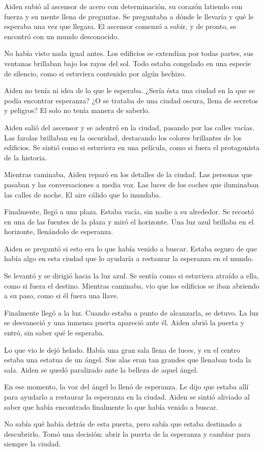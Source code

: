  
Aiden subió al ascensor de acero con determinación, su corazón latiendo con fuerza y su mente llena de preguntas. Se preguntaba a dónde le llevaría y qué le esperaba una vez que llegara. El ascensor comenzó a subir, y de pronto, se encontró con un mundo desconocido.

No había visto nada igual antes. Los edificios se extendían por todas partes, sus ventanas brillaban bajo los rayos del sol. Todo estaba congelado en una especie de silencio, como si estuviera contenido por algún hechizo.

Aiden no tenía ni idea de lo que le esperaba. ¿Sería ésta una ciudad en la que se podía encontrar esperanza? ¿O se trataba de una ciudad oscura, llena de secretos y peligros? El solo no tenía manera de saberlo.

Aiden salió del ascensor y se adentró en la ciudad, pasando por las calles vacías. Las farolas brillaban en la oscuridad, destacando los colores brillantes de los edificios. Se sintió como si estuviera en una película, como si fuera el protagonista de la historia.

Mientras caminaba, Aiden reparó en los detalles de la ciudad. Las personas que pasaban y las conversaciones a media voz. Las luces de los coches que iluminaban las calles de noche. El aire cálido que lo inundaba.

Finalmente, llegó a una plaza. Estaba vacía, sin nadie a su alrededor. Se recostó en una de las fuentes de la plaza y miró el horizonte. Una luz azul brillaba en el horizonte, llenándolo de esperanza.

Aiden se preguntó si esto era lo que había venido a buscar. Estaba seguro de que había algo en esta ciudad que lo ayudaría a restaurar la esperanza en el mundo.

Se levantó y se dirigió hacia la luz azul. Se sentía como si estuviera atraído a ella, como si fuera el destino. Mientras caminaba, vio que los edificios se iban abriendo a su paso, como si él fuera una llave.

Finalmente llegó a la luz. Cuando estaba a punto de alcanzarla, se detuvo. La luz se desvaneció y una inmensa puerta apareció ante él. Aiden abrió la puerta y entró, sin saber qué le esperaba.

Lo que vio le dejó helado. Había una gran sala llena de luces, y en el centro estaba una estatua de un ángel. Sus alas eran tan grandes que llenaban toda la sala. Aiden se quedó paralizado ante la belleza de aquel ángel.

En ese momento, la voz del ángel lo llenó de esperanza. Le dijo que estaba allí para ayudarlo a restaurar la esperanza en la ciudad. Aiden se sintió aliviado al saber que había encontrado finalmente lo que había venido a buscar.

No sabía qué había detrás de esta puerta, pero sabía que estaba destinado a descubrirlo. Tomó una decisión: abrir la puerta de la esperanza y cambiar para siempre la ciudad.